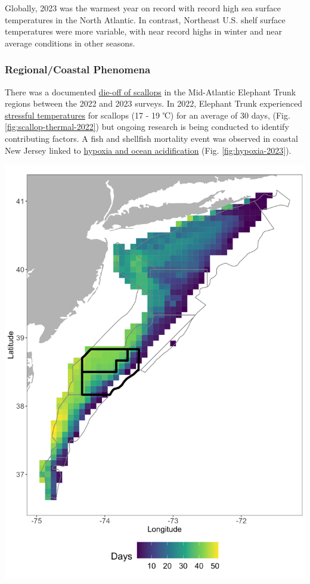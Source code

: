\documentclass[
  10pt,
]{article}
\let\origfigure\figure
\let\endorigfigure\endfigure
\renewenvironment{figure}[1][2] {
    \expandafter\origfigure\expandafter[H]
} {
    \endorigfigure
}
\begin{document}
Globally, 2023 was the warmest year on record with record high sea surface temperatures in the North Atlantic. In contrast, Northeast U.S. shelf surface temperatures were more variable, with near record highs in winter and near average conditions in other seasons.

\hypertarget{regionalcoastal-phenomena}{%
\subsubsection{Regional/Coastal Phenomena}\label{regionalcoastal-phenomena}}

There was a documented \href{https://noaa-edab.github.io/catalog/observation_synthesis.html}{die-off of scallops} in the Mid-Atlantic Elephant Trunk regions between the 2022 and 2023 surveys. In 2022, Elephant Trunk experienced \href{https://noaa-edab.github.io/catalog/thermal_habitat_persistence.html}{stressful temperatures} for scallops (17 - 19 ℃) for an average of 30 days, (Fig. \ref{fig:scallop-thermal-2022}) but ongoing research is being conducted to identify contributing factors. A fish and shellfish mortality event was observed in coastal New Jersey linked to \href{https://noaa-edab.github.io/catalog/ocean_acidification.html}{hypoxia and ocean acidification} (Fig. \ref{fig:hypoxia-2023}).

\begin{figure}

{\centering \includegraphics[width=0.5\linewidth]{images/bottom_temp_threshold_17_19_Elephant_Trunk} 

}

\caption{The number of days in 2022 where bottom temperature was between 17 and 19 ℃  (sressful thermal temperatures for sea scallops)in each GLORYS grid cell. The gray lines show the sea scallop estimation areas, with the Elephant Trunk region highlighted in black lines.}\label{fig:scallop-thermal-2022}
\end{figure}
\end{document}
